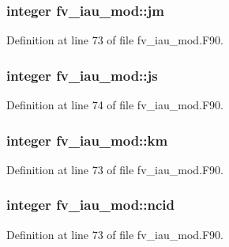 \subsubsection[{jm}]{\setlength{\rightskip}{0pt plus 5cm}integer fv\-\_\-iau\-\_\-mod\-::jm\hspace{0.3cm}{\ttfamily [private]}}\label{classfv__iau__mod_a6c78ca52b83ca9f3e6045d9f06f889bc}


Definition at line 73 of file fv\-\_\-iau\-\_\-mod.\-F90.

\subsubsection[{js}]{\setlength{\rightskip}{0pt plus 5cm}integer fv\-\_\-iau\-\_\-mod\-::js\hspace{0.3cm}{\ttfamily [private]}}\label{classfv__iau__mod_a8cfba167a9bf88f42967b9bb5644443c}


Definition at line 74 of file fv\-\_\-iau\-\_\-mod.\-F90.

\subsubsection[{km}]{\setlength{\rightskip}{0pt plus 5cm}integer fv\-\_\-iau\-\_\-mod\-::km\hspace{0.3cm}{\ttfamily [private]}}\label{classfv__iau__mod_a59eb624f87e12b21694f85684d1c89b7}


Definition at line 73 of file fv\-\_\-iau\-\_\-mod.\-F90.

\subsubsection[{ncid}]{\setlength{\rightskip}{0pt plus 5cm}integer fv\-\_\-iau\-\_\-mod\-::ncid\hspace{0.3cm}{\ttfamily [private]}}\label{classfv__iau__mod_a723f72c8cff32995d1dcd3a7f2661df2}


Definition at line 73 of file fv\-\_\-iau\-\_\-mod.\-F90.

